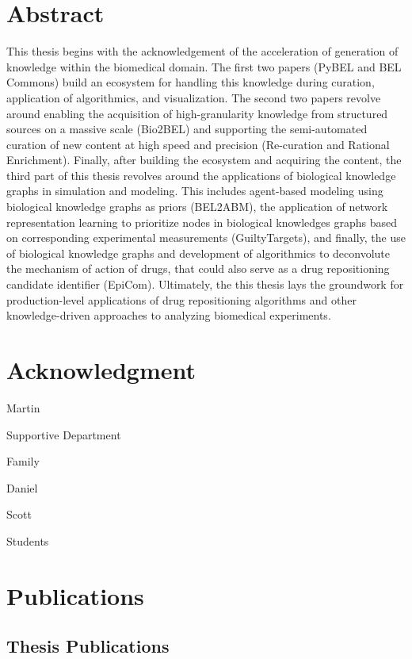 \chapter*{Abstract}

This thesis begins with the acknowledgement of the acceleration of generation of knowledge within the biomedical
domain. The first two papers (PyBEL and BEL Commons) build an ecosystem for handling this knowledge during curation,
application of algorithmics, and visualization. The second two papers revolve around enabling the acquisition of
high-granularity knowledge from structured sources on a massive scale (Bio2BEL) and supporting the semi-automated
curation of new content at high speed and precision (Re-curation and Rational Enrichment). Finally, after building
the ecosystem and acquiring the content, the third part of this thesis revolves around the applications of biological
knowledge graphs in simulation and modeling. This includes agent-based modeling using biological knowledge graphs as
priors (BEL2ABM), the application of network representation learning to prioritize nodes in biological knowledges
graphs based on corresponding experimental measurements (GuiltyTargets), and finally, the use of biological knowledge
graphs and development of algorithmics to deconvolute the mechanism of action of drugs, that could also serve as a drug
repositioning candidate identifier (EpiCom). Ultimately, the this thesis lays the groundwork for production-level
applications of drug repositioning algorithms and other knowledge-driven approaches to analyzing biomedical experiments.

\setlength{\parskip}{1em}								%
\renewcommand{\baselinestretch}{1.2}					%


\chapter*{Acknowledgment}

Martin

Supportive Department

Family

Daniel

Scott

Students

\chapter*{Publications}

\section*{Thesis Publications}

